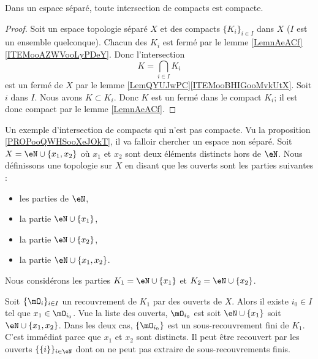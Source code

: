 \begin{proposition}     \label{PROPooQWHSooXeJOkT}
	Dans un espace séparé, toute intersection de compacts est compacte.
\end{proposition}

\begin{proof}
	Soit un espace topologie séparé \( X\) et des compacts \( \{ K_i \}_{i\in I}\) dans \( X\) (\( I\) est un ensemble quelconque). Chacun des \( K_i\) est fermé par le lemme \ref{LemnAeACf}\ref{ITEMooAZWVooLyPDeY}. Donc l'intersection
	\begin{equation}
		K=\bigcap_{i\in I} K_i
	\end{equation}
	est un fermé de \( X\) par le lemme \ref{LemQYUJwPC}\ref{ITEMooBHIGooMvkUtX}. Soit \( i\) dans \( I\). Nous avons \( K\subset K_i\). Donc \( K\) est un fermé dans le compact \( K_i\); il est donc compact par le lemme \ref{LemnAeACf}.
\end{proof}

\begin{example}
	Un exemple d'intersection de compacts qui n'est pas compacte. Vu la proposition \ref{PROPooQWHSooXeJOkT}, il va falloir chercher un espace non séparé. Soit \( X=\eN\cup\{ x_1,x_2 \}\) où \( x_1\) et \( x_2\) sont deux éléments distincts hors de \( \eN\). Nous définissons une topologie sur \( X\) en disant que les ouverts sont les parties suivantes :
	\begin{itemize}
		\item les parties de \( \eN\),
		\item la partie \( \eN\cup\{ x_1 \}\),
		\item la partie \( \eN\cup\{ x_2 \}\),
		\item la partie \( \eN\cup\{ x_1,x_2 \}\).
	\end{itemize}
	Nous considérons les parties \( K_1=\eN\cup\{ x_1 \}\) et \(K_2= \eN\cup \{ x_2 \}\).
	\begin{subproof}
		Soit \( \{ \mO_i \}_{i\in I}\) un recouvrement de \( K_1\) par des ouverts de \( X\). Alors il existe \( i_0\in I\) tel que \( x_1\in\mO_{i_0}\). Vue la liste des ouverts, \( \mO_{i_0}\) est soit \( \eN\cup\{ x_1 \}\) soit \( \eN\cup\{ x_1,x_2 \}\). Dans les deux cas, \( \{ \mO_{i_0} \}\) est un sous-recouvrement fini de \( K_1\).
		\spitem[\( K_1\cap K_2=\eN\)]
		C'est immédiat parce que \( x_1\) et \( x_2\) sont distincts.
		Il peut être recouvert par les ouverts \( \{ \{ i \} \}_{i\in \eN}\) dont on ne peut pas extraire de sous-recouvrements finis.
	\end{subproof}
\end{example}

